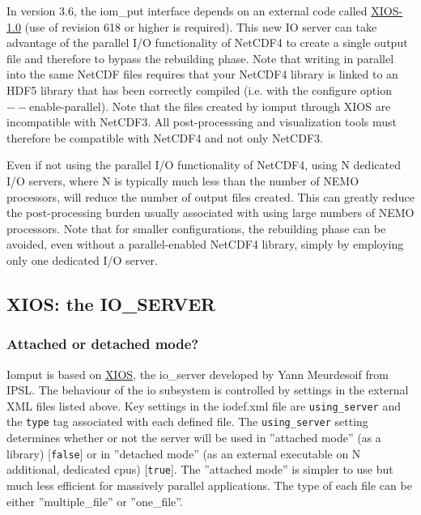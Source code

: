 \documentclass[NEMO_book]{subfiles}
\begin{document}
In version 3.6, the iom\_put interface depends on an external code called \href{https://forge.ipsl.jussieu.fr/ioserver/browser/XIOS/branchs/xios-1.0}{XIOS-1.0} (use of revision 618 or higher is required). This new IO server can take advantage of the parallel I/O functionality of NetCDF4 to create a single output file and therefore to bypass the rebuilding phase. Note that writing in parallel into the same NetCDF files requires that your NetCDF4 library is linked to an HDF5 library that has been correctly compiled (i.e. with the configure option $--$enable-parallel). Note that the files created by iomput through XIOS are incompatible with NetCDF3. All post-processsing and visualization tools must therefore be compatible with NetCDF4 and not only NetCDF3.

Even if not using the parallel I/O functionality of NetCDF4, using N dedicated I/O servers, where N is typically much less than the number of NEMO processors, will reduce the number of output files created. This can greatly reduce the post-processing burden usually associated with using large numbers of NEMO processors. Note that for smaller configurations, the rebuilding phase can be avoided, even without a parallel-enabled NetCDF4 library, simply by employing only one dedicated I/O server.

\subsection{XIOS: the IO\_SERVER}

\subsubsection{Attached or detached mode?}

Iomput is based on \href{http://forge.ipsl.jussieu.fr/ioserver/wiki}{XIOS}, the io\_server developed by Yann Meurdesoif from IPSL. The behaviour of the io subsystem is controlled by settings in the external XML files listed above. Key settings in the iodef.xml file are {\tt using\_server} and the {\tt type} tag associated with each defined file. The {\tt using\_server} setting determines whether or not the server will be used in ''attached mode'' (as a library) [{\tt false}] or in ''detached mode'' (as an external executable on N additional, dedicated cpus) [{\tt true}]. The ''attached mode'' is simpler to use but much less efficient for massively parallel applications. The type of each file can be either ''multiple\_file'' or ''one\_file''.
\end{document}
